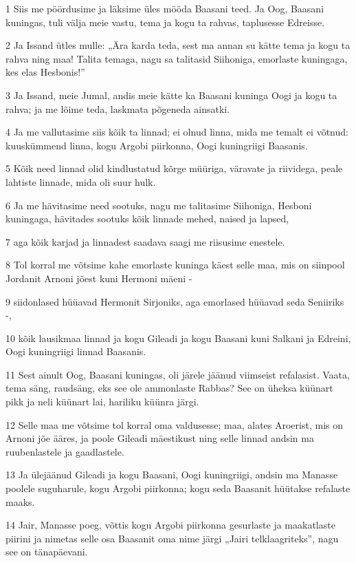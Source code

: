 \par 1 Siis me pöördusime ja läksime üles mööda Baasani teed. Ja Oog, Baasani kuningas, tuli välja meie vastu, tema ja kogu ta rahvas, taplusesse Edreisse.
\par 2 Ja Issand ütles mulle: „Ära karda teda, sest ma annan su kätte tema ja kogu ta rahva ning maa! Talita temaga, nagu sa talitasid Siihoniga, emorlaste kuningaga, kes elas Hesbonis!”
\par 3 Ja Issand, meie Jumal, andis meie kätte ka Baasani kuninga Oogi ja kogu ta rahva; ja me lõime teda, laskmata põgeneda ainsatki.
\par 4 Ja me vallutasime siis kõik ta linnad; ei olnud linna, mida me temalt ei võtnud: kuuskümmend linna, kogu Argobi piirkonna, Oogi kuningriigi Baasanis.
\par 5 Kõik need linnad olid kindlustatud kõrge müüriga, väravate ja riividega, peale lahtiste linnade, mida oli suur hulk.
\par 6 Ja me hävitasime need sootuks, nagu me talitasime Siihoniga, Hesboni kuningaga, hävitades sootuks kõik linnade mehed, naised ja lapsed,
\par 7 aga kõik karjad ja linnadest saadava saagi me riisusime enestele.
\par 8 Tol korral me võtsime kahe emorlaste kuninga käest selle maa, mis on siinpool Jordanit Arnoni jõest kuni Hermoni mäeni -
\par 9 siidonlased hüüavad Hermonit Sirjoniks, aga emorlased hüüavad seda Seniiriks -,
\par 10 kõik lausikmaa linnad ja kogu Gileadi ja kogu Baasani kuni Salkani ja Edreini, Oogi kuningriigi linnad Baasanis.
\par 11 Sest ainult Oog, Baasani kuningas, oli järele jäänud viimseist refalasist. Vaata, tema säng, raudsäng, eks see ole ammonlaste Rabbas? See on üheksa küünart pikk ja neli küünart lai, hariliku küünra järgi.
\par 12 Selle maa me võtsime tol korral oma valdusesse; maa, alates Aroerist, mis on Arnoni jõe ääres, ja poole Gileadi mäestikust ning selle linnad andsin ma ruubenlastele ja gaadlastele.
\par 13 Ja ülejäänud Gileadi ja kogu Baasani, Oogi kuningriigi, andsin ma Manasse poolele suguharule, kogu Argobi piirkonna; kogu seda Baasanit hüütakse refalaste maaks.
\par 14 Jair, Manasse poeg, võttis kogu Argobi piirkonna gesurlaste ja maakatlaste piirini ja nimetas selle osa Baasanit oma nime järgi „Jairi telklaagriteks”, nagu see on tänapäevani.

